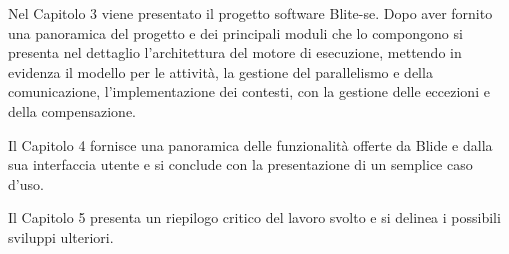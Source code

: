 Nel Capitolo 3 viene presentato il progetto software Blite-se. Dopo aver
fornito una panoramica del progetto e dei principali moduli che lo compongono si
presenta nel dettaglio l'architettura del motore di esecuzione, mettendo in
evidenza il modello per le attività, la gestione del parallelismo e della
comunicazione, l'implementazione dei contesti, con la gestione delle
eccezioni e della compensazione.

Il Capitolo 4 fornisce una panoramica delle funzionalità offerte da Blide e
dalla sua interfaccia utente e si conclude con la presentazione di un semplice
caso d'uso. 

Il Capitolo 5 presenta un riepilogo critico del lavoro svolto e si delinea i
possibili sviluppi ulteriori.
